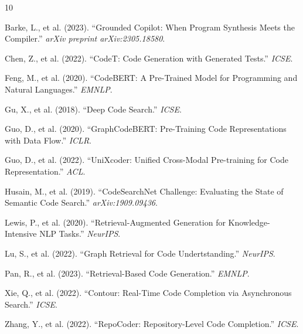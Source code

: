 \documentclass[10pt,twocolumn]{article}
\begin{document}

\begin{thebibliography}{10}

Barke, L., et al. (2023). ``Grounded Copilot: When Program Synthesis Meets the Compiler.'' \textit{arXiv preprint arXiv:2305.18580}.

Chen, Z., et al. (2022). ``CodeT: Code Generation with Generated Tests.'' \textit{ICSE}.

Feng, M., et al. (2020). ``CodeBERT: A Pre-Trained Model for Programming and Natural Languages.'' \textit{EMNLP}.

Gu, X., et al. (2018). ``Deep Code Search.'' \textit{ICSE}.

Guo, D., et al. (2020). ``GraphCodeBERT: Pre-Training Code Representations with Data Flow.'' \textit{ICLR}.

Guo, D., et al. (2022). ``UniXcoder: Unified Cross-Modal Pre-training for Code Representation.'' \textit{ACL}.

Husain, M., et al. (2019). ``CodeSearchNet Challenge: Evaluating the State of Semantic Code Search.'' \textit{arXiv:1909.09436}.

Lewis, P., et al. (2020). ``Retrieval-Augmented Generation for Knowledge-Intensive NLP Tasks.'' \textit{NeurIPS}.

Lu, S., et al. (2022). ``Graph Retrieval for Code Undertstanding.'' \textit{NeurIPS}.

Pan, R., et al. (2023). ``Retrieval-Based Code Generation.'' \textit{EMNLP}.

Xie, Q., et al. (2022). ``Contour: Real-Time Code Completion via Asynchronous Search.'' \textit{ICSE}.

Zhang, Y., et al. (2022). ``RepoCoder: Repository-Level Code Completion.'' \textit{ICSE}.

\end{thebibliography}
\end{document}
